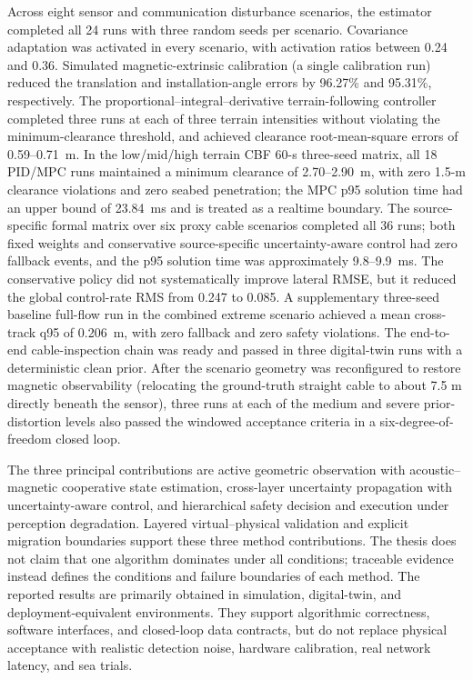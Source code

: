 \begin{abstract*}
  Across eight sensor and communication disturbance scenarios, the estimator completed all 24 runs with three random seeds per scenario. Covariance adaptation was activated in every scenario, with activation ratios between 0.24 and 0.36. Simulated magnetic-extrinsic calibration (a single calibration run) reduced the translation and installation-angle errors by 96.27\% and 95.31\%, respectively. The proportional--integral--derivative terrain-following controller completed three runs at each of three terrain intensities without violating the minimum-clearance threshold, and achieved clearance root-mean-square errors of 0.59--0.71~m. In the low/mid/high terrain CBF 60-s three-seed matrix, all 18 PID/MPC runs maintained a minimum clearance of 2.70--2.90~m, with zero 1.5-m clearance violations and zero seabed penetration; the MPC p95 solution time had an upper bound of 23.84~ms and is treated as a realtime boundary. The source-specific formal matrix over six proxy cable scenarios completed all 36 runs; both fixed weights and conservative source-specific uncertainty-aware control had zero fallback events, and the p95 solution time was approximately 9.8--9.9~ms. The conservative policy did not systematically improve lateral RMSE, but it reduced the global control-rate RMS from 0.247 to 0.085. A supplementary three-seed baseline full-flow run in the combined extreme scenario achieved a mean cross-track q95 of 0.206~m, with zero fallback and zero safety violations. The end-to-end cable-inspection chain was ready and passed in three digital-twin runs with a deterministic clean prior. After the scenario geometry was reconfigured to restore magnetic observability (relocating the ground-truth straight cable to about 7.5 m directly beneath the sensor), three runs at each of the medium and severe prior-distortion levels also passed the windowed acceptance criteria in a six-degree-of-freedom closed loop.

  The three principal contributions are active geometric observation with acoustic--magnetic cooperative state estimation, cross-layer uncertainty propagation with uncertainty-aware control, and hierarchical safety decision and execution under perception degradation. Layered virtual--physical validation and explicit migration boundaries support these three method contributions. The thesis does not claim that one algorithm dominates under all conditions; traceable evidence instead defines the conditions and failure boundaries of each method. The reported results are primarily obtained in simulation, digital-twin, and deployment-equivalent environments. They support algorithmic correctness, software interfaces, and closed-loop data contracts, but do not replace physical acceptance with realistic detection noise, hardware calibration, real network latency, and sea trials.


\end{abstract*}
